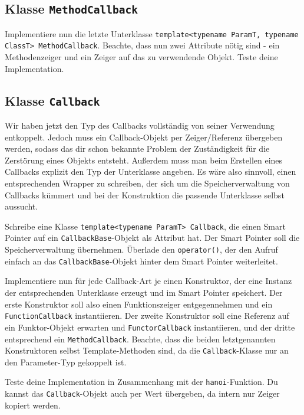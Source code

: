 \subsection{Klasse \lstinline{MethodCallback}}
Implementiere nun die letzte Unterklasse \lstinline{template<typename ParamT, typename ClassT> MethodCallback}.
Beachte, dass nun zwei Attribute nötig sind - ein Methodenzeiger und ein Zeiger auf das zu verwendende Objekt.
Teste deine Implementation.


\subsection{Klasse \lstinline{Callback}}
Wir haben jetzt den Typ des Callbacks vollständig von seiner Verwendung entkoppelt.
Jedoch muss ein Callback-Objekt per Zeiger/Referenz übergeben werden, sodass das dir schon bekannte Problem der Zuständigkeit für die Zerstörung eines Objekts entsteht.
Außerdem muss man beim Erstellen eines Callbacks explizit den Typ der Unterklasse angeben.
Es wäre also sinnvoll, einen entsprechenden Wrapper zu schreiben, der sich um die Speicherverwaltung von Callbacks kümmert und bei der Konstruktion die passende Unterklasse selbst aussucht.

Schreibe eine Klasse \lstinline{template<typename ParamT> Callback}, die einen Smart Pointer auf ein \lstinline{CallbackBase}-Objekt als Attribut hat. Der Smart Pointer soll die Speicherverwaltung übernehmen. Überlade den \lstinline{operator()}, der den Aufruf einfach an das \lstinline{CallbackBase}-Objekt hinter dem Smart Pointer weiterleitet.

Implementiere nun für jede Callback-Art je einen Konstruktor, der eine Instanz der entsprechenden Unterklasse erzeugt und im Smart Pointer speichert.
Der erste Konstruktor soll also einen Funktionszeiger entgegennehmen und ein \lstinline{FunctionCallback} instantiieren.
Der zweite Konstruktor soll eine Referenz auf ein Funktor-Objekt erwarten und  \lstinline{FunctorCallback} instantiieren, und der dritte entsprechend ein \lstinline{MethodCallback}.
Beachte, dass die beiden letztgenannten Konstruktoren selbst Template-Methoden sind, da die \lstinline{Callback}-Klasse nur an den Parameter-Typ gekoppelt ist.

Teste deine Implementation in Zusammenhang mit der \lstinline{hanoi}-Funktion. Du kannst das \lstinline{Callback}-Objekt auch per Wert übergeben, da intern nur Zeiger kopiert werden.
